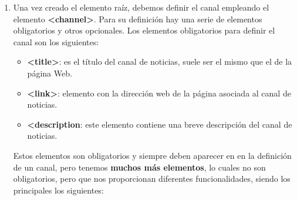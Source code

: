 \begin{enumerate}
    \item Una vez creado el elemento raíz, debemos definir el canal empleando el elemento \textbf{<channel>}. Para su definición hay una serie de elementos obligatorios y otros opcionales. Los elementos obligatorios para definir el canal son los siguientes:

    \begin{itemize}
        \item \textbf{<title>}: es el título del canal de noticias, suele ser el mismo que el de la página Web.
        \item \textbf{<link>}: elemento con la dirección web de la página asociada al canal de noticias.
        \item \textbf{<description}: este elemento contiene una breve descripción del canal de noticias.
    \end{itemize}

    Estos elementos son obligatorios y siempre deben aparecer en en la definición de un canal, pero tenemos \textbf{muchos más elementos}, lo cuales no son obligatorios, pero que nos proporcionan diferentes funcionalidades, siendo los principales los siguientes:


\end{enumerate}
